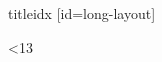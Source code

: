 \begin{ulSongs}{titleidx}
[id={long-layout}]
\newcount\LayoutStanza
{}
\def\LayoutIndent{0}
\loop

\advance{}
\ifnum\LayoutStanza<13
\repeat
\endsong
\end{ulSongs}
